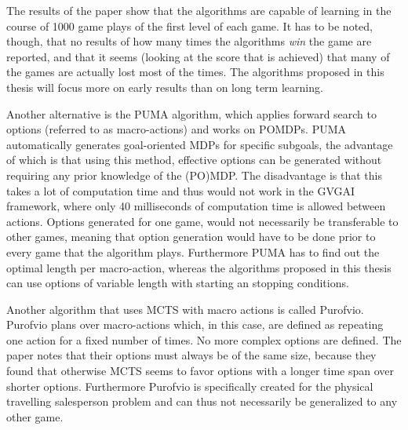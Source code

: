 The results of the paper show that the algorithms are capable of learning in the
course of 1000 game plays of the first level of each game. It has to be noted,
though, that no results of how many times the algorithms \emph{win} the game are
reported, and that it seems (looking at the score that is achieved) that many of
the games are actually lost most of the times. The algorithms proposed in this
thesis will focus more on early results than on long term learning.

Another alternative is the PUMA algorithm, which applies forward search to
options (referred to as macro-actions) and works on POMDPs. PUMA automatically
generates goal-oriented MDPs for specific subgoals, the advantage of which is
that using this method, effective options can be generated without requiring any
prior knowledge of the (PO)MDP. The disadvantage is that this takes a lot of
computation time and thus would not work in the GVGAI framework, where only 40
milliseconds of computation time is allowed between actions. Options generated
for one game, would not necessarily be transferable to other games, meaning that
option generation would have to be done prior to every game that the algorithm
plays. Furthermore PUMA has to find out the optimal length per macro-action,
whereas the algorithms proposed in this thesis can use options of variable
length with starting an stopping conditions.

Another algorithm that uses MCTS with macro actions is called Purofvio.
Purofvio plans over macro-actions which, in this case, are defined as repeating
one action for a fixed number of times. No more complex options are defined. The
paper notes that their options must always be of the same size, because they
found that otherwise MCTS seems to favor options with a longer time span over
shorter options. Furthermore Purofvio is specifically created for the physical
travelling salesperson problem and can thus not necessarily be generalized to
any other game.
